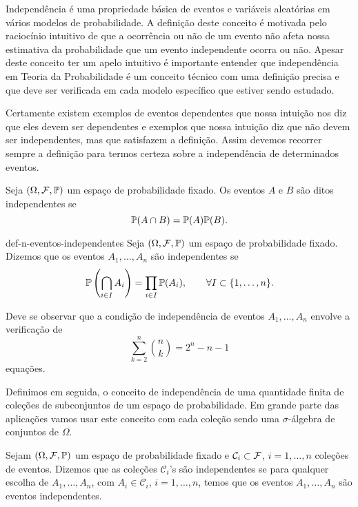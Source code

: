 Independência é uma propriedade básica de eventos e variáveis 
aleatórias em vários modelos de probabilidade. A definição deste
conceito é motivada pelo raciocínio intuitivo de que a ocorrência 
ou não de um evento não afeta nossa estimativa da probabilidade 
que um evento independente ocorra ou não. 
Apesar deste conceito ter um  apelo 
intuitivo é importante entender que independência em Teoria 
da Probabilidade é um conceito técnico com uma definição 
precisa e que deve ser verificada em cada modelo específico
que estiver sendo estudado.
 
Certamente existem exemplos de eventos dependentes que nossa 
intuição nos diz que eles devem ser dependentes e exemplos que 
nossa intuição diz que não devem ser independentes, mas que 
satisfazem a definição. Assim devemos recorrer sempre a definição 
para termos certeza sobre a independência de determinados eventos.  


\begin{definicao}
\label{def-2-eventos-independentes}
%
	Seja $(\Omega,\F,\P)$ um espaço de probabilidade fixado. 
	Os eventos $A$ e $B$ são ditos independentes  se 
		\[
			\P(A\cap B) = \P(A) \P(B).
		\]
%
\end{definicao}
%
%
%
%
%
\begin{definicao}{def-n-eventos-independentes}
Seja $(\Omega,\F,\P)$ um espaço de probabilidade fixado.
Dizemos que os eventos $A_1,\ldots,A_n$ são independentes
se 
	\[
		\P\left( \bigcap_{i\in I} A_i \right)
		=
		\prod_{i\in I} \P(A_i),
		\qquad
		\forall I\subset \{1,\ldots,n\}.
	\]	
\end{definicao}

Deve se observar que a condição de independência 
de eventos $A_1,\ldots,A_n$ envolve a verificação de 
	\[
		\sum_{k=2}^n \binom{n}{k} = 2^n-n-1
	\]
equações. 

Definimos em seguida, o conceito de independência de uma 
quantidade finita de coleções de subconjuntos de um espaço
de probabilidade. Em grande parte das aplicações vamos usar
este conceito com cada coleção sendo uma $\sigma$-álgebra 
de conjuntos de $\Omega$. 


\begin{definicao}
\label{def-n-colecoes-independentes}
Sejam $(\Omega,\F,\P)$ um espaço de probabilidade fixado
e $\mathcal{C}_i\subset \F$,  $i=1,\ldots,n$ 
coleções de eventos. 
Dizemos que as coleções $\mathcal{C}_i$'s são independentes
se para qualquer escolha de $A_1,\ldots,A_n$, 
com $A_i\in \mathcal{C}_i$, $i=1,\ldots,n$, temos que 
os eventos $A_1,\ldots,A_n$ são eventos independentes.
\end{definicao}


